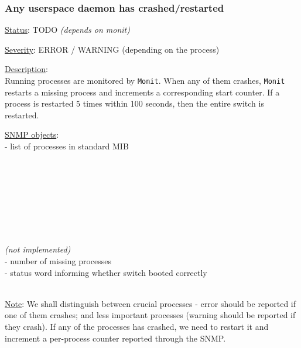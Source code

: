 \subsubsection{\bf Any userspace daemon has crashed/restarted}
		\label{fail:other:daemon_crash}
		\begin{pck_descr}
			\item [] \underline{Status}: TODO \emph{(depends on monit)}
			\item [] \underline{Severity}: ERROR / WARNING (depending on the process)
			\item [] \underline{Description}:\\
				Running processes are monitored by \texttt{Monit}. When any of them
				crashes, \texttt{Monit} restarts a missing process and increments a
				corresponding start counter. If a process is restarted 5 times within
				100 seconds, then the entire switch is restarted.
			\item [] \underline{SNMP objects}:\\
				 - list of processes in standard MIB\\
				\\
				\\
				\\
				\\
				\\
				\\
				\\
				\\
				 \emph{(not implemented)}\\
				 - number of missing processes\\
				 - status word informing whether switch booted correctly\\
				\\
			\item [] \underline{Note}: We shall distinguish between crucial
				processes - error should be reported if one of them crashes; and less
				important processes (warning should be reported if they crash). If any
				of the processes has crashed, we need to restart it and increment a
				per-process counter reported through the SNMP.


\end{pck_descr}
